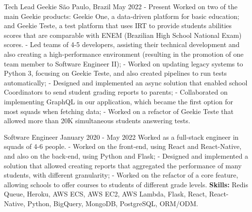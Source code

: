 \documentclass[11pt, a4paper]{awesome-cv-res}
\begin{document}
\makecvheader
\makecvfooter
{}
{}
{\thepage}

\begin{cventries}
\cventry
{Tech Lead}
{Geekie}
{São Paulo, Brazil}
{May 2022 - Present}
{
    Worked on two of the main Geekie products: Geekie One, a data-driven 
    platform for basic education; and Geekie Teste, a test platform that 
    uses IRT to provide students abilities scores that are comparable 
    with ENEM (Brazilian High School National Exam) scores.
    \newline
    - Led teams of 4-5 developers, assisting their technical development
    and also creating a high-performance environment (resulting in the
    promotion of one team member to Software Engineer II);
    \newline
    - Worked on updating legacy systems to Python 3, focusing on Geekie 
    Teste, and also created pipelines to run tests automatically;
    \newline
    - Designed and implemented an async solution that enabled school
    Coordinators to send student grading reports to parents;
    \newline
    - Collaborated on implementing GraphQL in our application, 
    which became the first option for most squads when fetching data;
    \newline
    - Worked on a refactor of Geekie Teste that allowed more than 20K
    simultaneous students answering tests.
}    
    
\cventry
{Software Engineer}
{}
{}
{January 2020 - May 2022}
{
    Worked as a full-stack engineer in squads of 4-6 people.
    \newline
    - Worked on the front-end, using React and React-Native, and also on
    the back-end, using Python and Flask;
    \newline
    - Designed and implemented a solution that allowed creating reports
    that aggregated the performance of many students, with different
    granularity;
    \newline
    - Worked on the refactor of a core feature, allowing schools to
    offer courses to students of different grade levels.
\newline\textbf{Skills:}  Redis Queue, Heroku, AWS ECS, AWS EC2, AWS
    Lambda, Flask, React, React-Native, Python, BigQuery, MongoDB,
    PostgreSQL, ORM/ODM.
}


\end{cventries}
\end{document}
